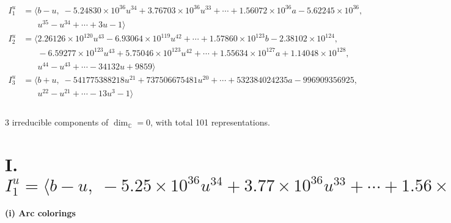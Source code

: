 \documentclass[1p]{elsarticle_modified}
\theoremstyle{definition}
\begin{document}
\begin{align*}
I^u_{1}&=\langle 
b- u,\;-5.24830\times10^{36} u^{34}+3.76703\times10^{36} u^{33}+\cdots+1.56072\times10^{36} a-5.62245\times10^{36},\\
\phantom{I^u_{1}}&\phantom{= \langle  }u^{35}- u^{34}+\cdots+3 u-1\rangle \\
I^u_{2}&=\langle 
2.26126\times10^{120} u^{43}-6.93064\times10^{119} u^{42}+\cdots+1.57860\times10^{123} b-2.38102\times10^{124},\\
\phantom{I^u_{2}}&\phantom{= \langle  }-6.59277\times10^{123} u^{43}+5.75046\times10^{123} u^{42}+\cdots+1.55634\times10^{127} a+1.14048\times10^{128},\\
\phantom{I^u_{2}}&\phantom{= \langle  }u^{44}- u^{43}+\cdots-34132 u+9859\rangle \\
I^u_{3}&=\langle 
b+u,\;-541775388218 u^{21}+737506675481 u^{20}+\cdots+532384024235 a-996909356925,\\
\phantom{I^u_{3}}&\phantom{= \langle  }u^{22}- u^{21}+\cdots-13 u^3-1\rangle \\
\\
\end{align*}
\raggedright * 3 irreducible components of $\dim_{\mathbb{C}}=0$, with total 101 representations.\\
\newpage
\renewcommand{\arraystretch}{1}
\centering \section*{I. $I^u_{1}= \langle b- u,\;-5.25\times10^{36} u^{34}+3.77\times10^{36} u^{33}+\cdots+1.56\times10^{36} a-5.62\times10^{36},\;u^{35}- u^{34}+\cdots+3 u-1 \rangle$}
\flushleft \textbf{(i) Arc colorings}\\
\end{document}
